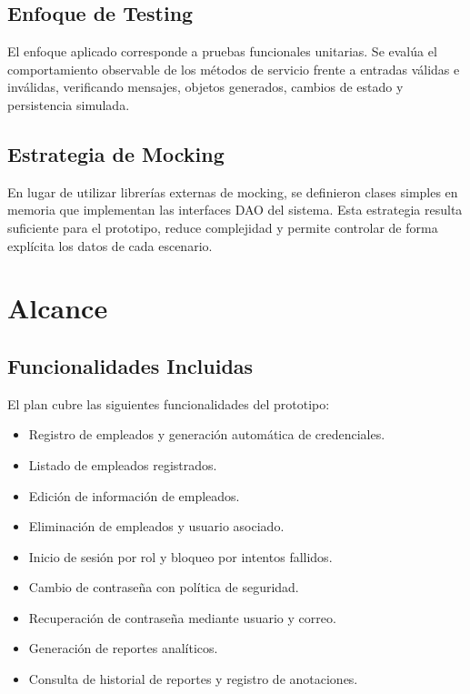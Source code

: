 \documentclass[12pt,a4paper]{article}
\begin{document}
\subsection{Enfoque de Testing}

El enfoque aplicado corresponde a pruebas funcionales unitarias. Se evalúa el comportamiento observable de los métodos de servicio frente a entradas válidas e inválidas, verificando mensajes, objetos generados, cambios de estado y persistencia simulada.

\subsection{Estrategia de Mocking}

En lugar de utilizar librerías externas de mocking, se definieron clases simples en memoria que implementan las interfaces DAO del sistema. Esta estrategia resulta suficiente para el prototipo, reduce complejidad y permite controlar de forma explícita los datos de cada escenario.

\section{Alcance}

\subsection{Funcionalidades Incluidas}

El plan cubre las siguientes funcionalidades del prototipo:

\begin{itemize}[leftmargin=*]
    \item Registro de empleados y generación automática de credenciales.
    \item Listado de empleados registrados.
    \item Edición de información de empleados.
    \item Eliminación de empleados y usuario asociado.
    \item Inicio de sesión por rol y bloqueo por intentos fallidos.
    \item Cambio de contraseña con política de seguridad.
    \item Recuperación de contraseña mediante usuario y correo.
    \item Generación de reportes analíticos.
    \item Consulta de historial de reportes y registro de anotaciones.
\end{itemize}
\end{document}
